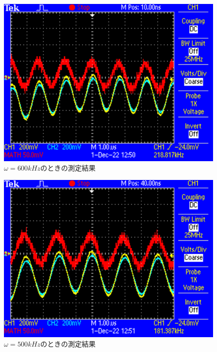 \begin{figure}[H]
    \centering
    \includegraphics[scale=0.5]{F0005.pdf}
    \caption{$\omega=600\si{kHz}$のときの測定結果}
\end{figure}

\begin{figure}[H]
    \centering
    \includegraphics[scale=0.5]{F0006.pdf}
    \caption{$\omega=500\si{kHz}$のときの測定結果}
\end{figure}